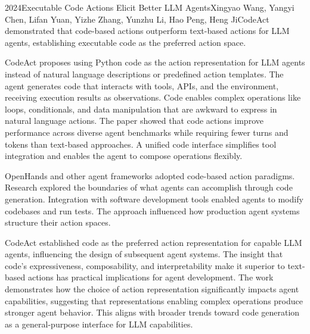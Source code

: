 
\begin{papersummary}{2024}{Executable Code Actions Elicit Better LLM Agents}{Xingyao Wang, Yangyi Chen, Lifan Yuan, Yizhe Zhang, Yunzhu Li, Hao Peng, Heng Ji}{CodeAct demonstrated that code-based actions outperform text-based actions for LLM agents, establishing executable code as the preferred action space.}

CodeAct proposes using Python code as the action representation for LLM agents instead of natural language descriptions or predefined action templates. The agent generates code that interacts with tools, APIs, and the environment, receiving execution results as observations. Code enables complex operations like loops, conditionals, and data manipulation that are awkward to express in natural language actions. The paper showed that code actions improve performance across diverse agent benchmarks while requiring fewer turns and tokens than text-based approaches. A unified code interface simplifies tool integration and enables the agent to compose operations flexibly.

OpenHands and other agent frameworks adopted code-based action paradigms. Research explored the boundaries of what agents can accomplish through code generation. Integration with software development tools enabled agents to modify codebases and run tests. The approach influenced how production agent systems structure their action spaces.

CodeAct established code as the preferred action representation for capable LLM agents, influencing the design of subsequent agent systems. The insight that code's expressiveness, composability, and interpretability make it superior to text-based actions has practical implications for agent development. The work demonstrates how the choice of action representation significantly impacts agent capabilities, suggesting that representations enabling complex operations produce stronger agent behavior. This aligns with broader trends toward code generation as a general-purpose interface for LLM capabilities.

\end{papersummary}
